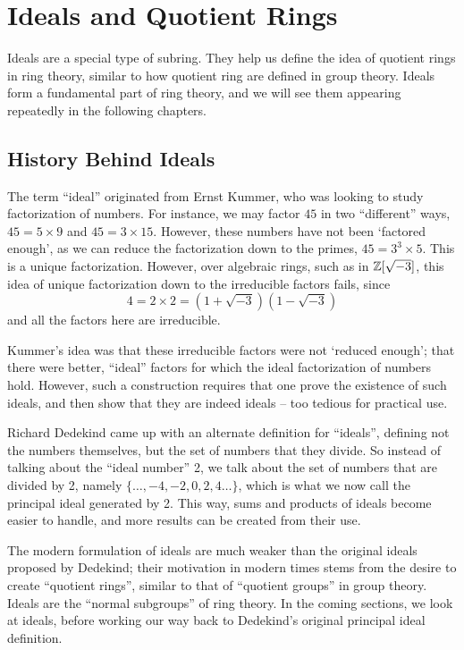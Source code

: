 \chapter{Ideals and Quotient Rings}
Ideals are a special type of subring. They help us define the idea of quotient rings in ring theory, similar to how quotient ring are defined in group theory. Ideals form a fundamental part of ring theory, and we will see them appearing repeatedly in the following chapters.

\section{History Behind Ideals}
The term ``ideal'' originated from Ernst Kummer, who was looking to study factorization of numbers. For instance, we may factor $45$ in two ``different'' ways, $45 = 5 \times 9$ and $45 = 3 \times 15$. However, these numbers have not been `factored enough', as we can reduce the factorization down to the primes, $45 = 3^3 \times 5$. This is a unique factorization. However, over algebraic rings, such as in $\mathbb{Z}[\sqrt{-3}]$, this idea of unique factorization down to the irreducible factors fails, since
\[
    4 = 2 \times 2 = (1+\sqrt{-3})(1-\sqrt{-3})
\]
and all the factors here are irreducible.

Kummer's idea was that these irreducible factors were not `reduced enough'; that there were better, ``ideal'' factors for which the ideal factorization of numbers hold. However, such a construction requires that one prove the existence of such ideals, and then show that they are indeed ideals -- too tedious for practical use.

Richard Dedekind came up with an alternate definition for ``ideals'', defining not the numbers themselves, but the set of numbers that they divide. So instead of talking about the ``ideal number'' 2, we talk about the set of numbers that are divided by 2, namely $\{\dots, -4, -2, 0, 2, 4 \dots\}$, which is what we now call the principal ideal generated by 2. This way, sums and products of ideals become easier to handle, and more results can be created from their use.

The modern formulation of ideals are much weaker than the original ideals proposed by Dedekind; their motivation in modern times stems from the desire to create ``quotient rings'', similar to that of ``quotient groups'' in group theory. Ideals are the ``normal subgroups'' of ring theory. In the coming sections, we look at ideals, before working our way back to Dedekind's original principal ideal definition.


